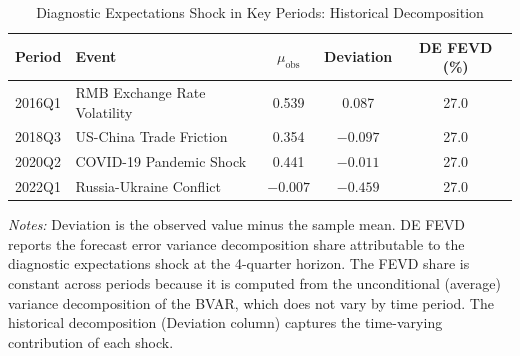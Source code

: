 \begin{table}[!htbp]
\centering
\begin{threeparttable}
\caption{Diagnostic Expectations Shock in Key Periods: Historical Decomposition}
\label{tab:bvar_hist}
\begin{tabular}{llccc}
\toprule
Period & Event & $\mu_{\text{obs}}$ & Deviation & DE FEVD (\%) \\
\midrule
2016Q1 & RMB Exchange Rate Volatility & 0.539 & 0.087 & 27.0 \\
2018Q3 & US-China Trade Friction & 0.354 & $-0.097$ & 27.0 \\
2020Q2 & COVID-19 Pandemic Shock & 0.441 & $-0.011$ & 27.0 \\
2022Q1 & Russia-Ukraine Conflict & $-0.007$ & $-0.459$ & 27.0 \\
\bottomrule
\end{tabular}
\begin{tablenotes}[flushleft]
\footnotesize
\item \textit{Notes:} Deviation is the observed value minus the sample mean. DE FEVD reports the forecast error variance decomposition share attributable to the diagnostic expectations shock at the 4-quarter horizon. The FEVD share is constant across periods because it is computed from the unconditional (average) variance decomposition of the BVAR, which does not vary by time period. The historical decomposition (Deviation column) captures the time-varying contribution of each shock.
\end{tablenotes}
\end{threeparttable}
\end{table}
